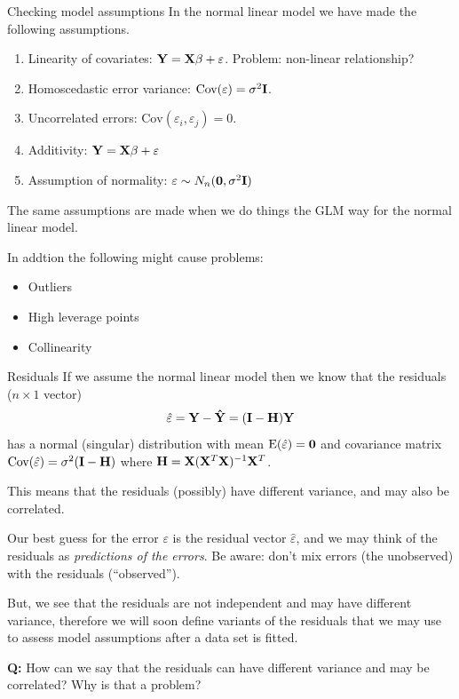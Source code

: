 \documentclass[
  ignorenonframetext,
]{beamer}
\providecommand{\tightlist}{%
  \setlength{\itemsep}{0pt}\setlength{\parskip}{0pt}}
\begin{document}
\begin{frame}{Checking model assumptions}
\protect{}\label{checking-model-assumptions-1}
In the normal linear model we have made the following assumptions.

\begin{enumerate}
\item
  Linearity of covariates: \({\bf Y}={\bf X}\beta+\varepsilon\).
  Problem: non-linear relationship?
\item
  Homoscedastic error variance:
  \(\text{Cov}(\varepsilon)=\sigma^2 {\bf I}\).
\item
  Uncorrelated errors: \(\text{Cov}(\varepsilon_i,\varepsilon_j)=0\).
\item
  Additivity: \({\bf Y}={\bf X}\beta+\varepsilon\)
\item
  Assumption of normality:
  \(\varepsilon \sim N_n({\bf 0},\sigma^2{\bf I})\)
\end{enumerate}

The same assumptions are made when we do things the GLM way for the
normal linear model.

In addtion the following might cause problems:

\begin{itemize}
\tightlist
\item
  Outliers
\item
  High leverage points
\item
  Collinearity
\end{itemize}
\end{frame}

\begin{frame}
\begin{block}{Residuals}
\protect{}\label{residuals}
If we assume the normal linear model then we know that the residuals
(\(n\times 1\) vector)
\[\hat{\varepsilon}={\bf Y}-{\bf \hat{Y}}=({\bf I}-{\bf H}){\bf Y}\] has
a normal (singular) distribution with mean
\(\text{E}(\hat{\varepsilon})={\bf 0}\) and covariance matrix
\(\text{Cov}(\hat{ \varepsilon})=\sigma^2({\bf I}-{\bf H})\) where
\({\bf H}={\bf X}({\bf X}^T{\bf X})^{-1}{\bf X}^T\).

This means that the residuals (possibly) have different variance, and
may also be correlated.
\end{block}
\end{frame}

\begin{frame}
Our best guess for the error \(\varepsilon\) is the residual vector
\(\hat{\varepsilon}\), and we may think of the residuals as
\emph{predictions of the errors}. Be aware: don't mix errors (the
unobserved) with the residuals (``observed'').

But, we see that the residuals are not independent and may have
different variance, therefore we will soon define variants of the
residuals that we may use to assess model assumptions after a data set
is fitted.

\textbf{Q:} How can we say that the residuals can have different
variance and may be correlated? Why is that a problem?
\end{frame}
\end{document}
